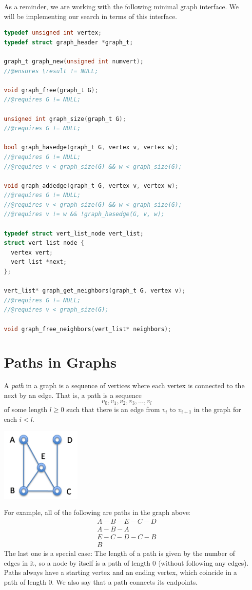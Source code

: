 \begin{gram}[graph.h]
As a reminder, we are working with the following minimal graph
interface.  We will be implementing our search in terms of this
interface.
\begin{lstlisting}[language=c]
typedef unsigned int vertex;
typedef struct graph_header *graph_t;

graph_t graph_new(unsigned int numvert);
//@ensures \result != NULL;

void graph_free(graph_t G);
//@requires G != NULL;

unsigned int graph_size(graph_t G);
//@requires G != NULL;

bool graph_hasedge(graph_t G, vertex v, vertex w);
//@requires G != NULL;
//@requires v < graph_size(G) && w < graph_size(G);

void graph_addedge(graph_t G, vertex v, vertex w);
//@requires G != NULL;
//@requires v < graph_size(G) && w < graph_size(G);
//@requires v != w && !graph_hasedge(G, v, w);

typedef struct vert_list_node vert_list;
struct vert_list_node {
  vertex vert;
  vert_list *next;
};

vert_list* graph_get_neighbors(graph_t G, vertex v);
//@requires G != NULL;
//@requires v < graph_size(G);

void graph_free_neighbors(vert_list* neighbors);
\end{lstlisting}
\end{gram}

\section{Paths in Graphs}
\label{sec:graphsearch:paths}

A \emph{path} in a graph is a sequence of vertices where each vertex
is connected to the next by an edge.  That is, a path is a sequence
$$
v_0, v_1, v_2, v_3, \dots, v_l
$$
of some length $l\geq0$ such that there is an edge from $v_i$ to
$v_{i+1}$ in the graph for each $i<l$.
\begin{center}
  \includegraphics[width=0.3\textwidth]{img/graph0.png}
\end{center}
For example, all of the following are paths in the graph above:
$$
\begin{array}{l}
A-B-E-C-D \\
A-B-A \\
E-C-D-C-B \\
B
\end{array}
$$
The last one is a special case: The length of a path is given by the
number of edges in it, so a node by itself is a path of length 0
(without following any edges).  Paths always have a starting vertex
and an ending vertex, which coincide in a path of length 0.  We also
say that a path connects its endpoints.

